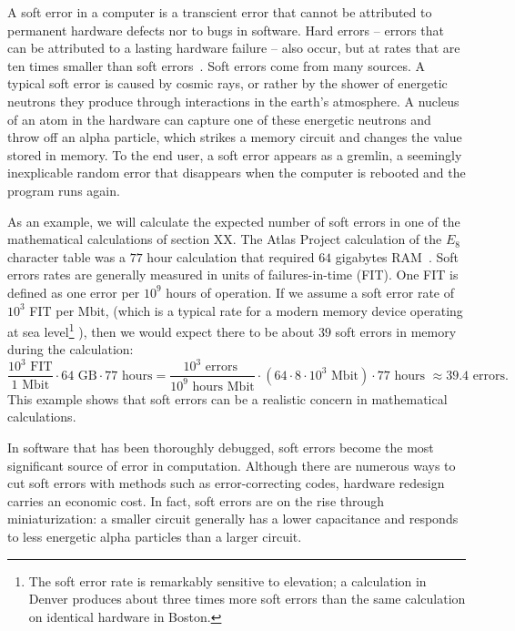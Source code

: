 \documentclass{llncs}
\begin{document}
A soft error in a computer is a transcient error that cannot be
attributed to permanent hardware defects nor to bugs in software.  
Hard errors -- errors that can be attributed to a lasting hardware failure --
also occur, but at rates that are ten times smaller than
soft errors~\cite{MW04}.
Soft errors come from many sources. A
typical soft error is caused by cosmic rays, or rather by the shower
of energetic neutrons they produce through interactions in the earth's
atmosphere.  A nucleus of an atom in the hardware can capture one of
these energetic neutrons and throw off an alpha particle, which
strikes a memory circuit and changes the value stored in memory.  To
the end user, a soft error appears as a gremlin, a seemingly
inexplicable random error that disappears when the computer is rebooted and
the program runs again.

As an example, we will calculate the expected
number of soft errors in one of the mathematical calculations of
section XX.  The Atlas Project calculation of
the $E_8$ character table was a $77$ hour calculation that required
$64$ gigabytes RAM~\cite{AtlasSlides}.  Soft errors rates are generally measured in units
of failures-in-time (FIT). One FIT is defined as one error per $10^9$
hours of operation.
If we assume a soft error rate of $10^3$ FIT per Mbit, (which is a
typical rate for a modern memory device operating at sea
level\footnote{The soft error rate is remarkably sensitive to
  elevation; a calculation in Denver produces about three times more
  soft errors than the same calculation on identical hardware in Boston.}
\cite{WP}),
 then we would expect there to be about $39$ soft
errors in memory during the calculation:
\[
\frac{10^3 \text{~FIT}}{1\text{~Mbit}} \cdot 64 \text{~GB} \cdot 77\text{~hours} =
\frac{10^3 \text{~errors~}}{10^9\text{~hours~}\text{Mbit}} \cdot
({64\cdot 8\cdot 10^3 \text{~Mbit}}) \cdot 77\text{~hours~} 
\approx 39.4 \text{~errors}.
\]
This example shows that soft errors can be a realistic concern in
mathematical calculations.

In software that has been thoroughly debugged, soft errors become the
most significant source of error in computation.  Although there are
numerous ways to cut soft errors with methods such as error-correcting
codes, hardware redesign carries an economic cost.  In fact, soft errors are on
the rise through miniaturization: a smaller circuit generally has a lower
capacitance and responds to less energetic alpha particles than a larger
circuit.
\end{document}
